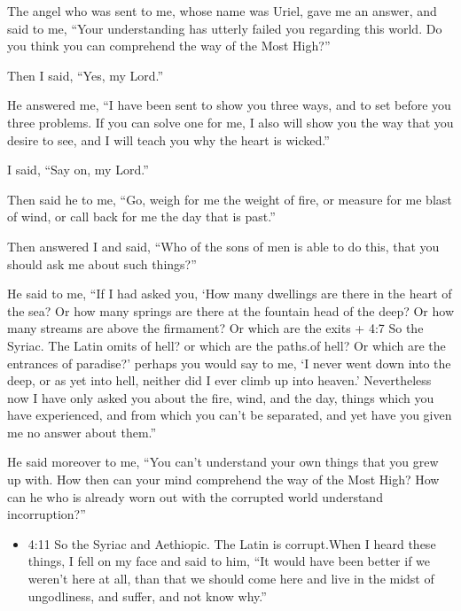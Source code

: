  The angel who was sent to me, whose name was Uriel, gave me
an answer,  and said to me, ``Your understanding has utterly
failed you regarding this world. Do you think you can comprehend the way
of the Most High?''

 Then I said, ``Yes, my Lord.''

He answered me, ``I have been sent to show you three ways, and to set
before you three problems.  If you can solve one for me, I
also will show you the way that you desire to see, and I will teach you
why the heart is wicked.''

 I said, ``Say on, my Lord.''

Then said he to me, ``Go, weigh for me the weight of fire, or measure
for me blast of wind, or call back for me the day that is past.''

 Then answered I and said, ``Who of the sons of men is able
to do this, that you should ask me about such things?''

 He said to me, ``If I had asked you, `How many dwellings
are there in the heart of the sea? Or how many springs are there at the
fountain head of the deep? Or how many streams are above the firmament?
Or which are the exits + 4:7 So the Syriac. The Latin omits of hell? or
which are the paths.of hell? Or which are the entrances of paradise?'
 perhaps you would say to me, `I never went down into the
deep, or as yet into hell, neither did I ever climb up into heaven.'
 Nevertheless now I have only asked you about the fire,
wind, and the day, things which you have experienced, and from which you
can't be separated, and yet have you given me no answer about them.''

 He said moreover to me, ``You can't understand your own
things that you grew up with.  How then can your mind
comprehend the way of the Most High? How can he who is already worn out
with the corrupted world understand incorruption?''

\begin{itemize}
\tightlist
\item
  4:11 So the Syriac and Aethiopic. The Latin is corrupt.When I heard
  these things, I fell on my face  and said to him, ``It
  would have been better if we weren't here at all, than that we should
  come here and live in the midst of ungodliness, and suffer, and not
  know why.''
\end{itemize}

